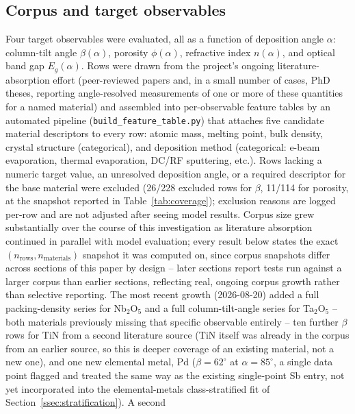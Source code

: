 \documentclass[aip,amsmath,amssymb,reprint]{revtex4-1}
\begin{document}
\subsection{Corpus and target observables}
\label{ssec:corpus}

Four target observables were evaluated, all as a function of
deposition angle $\alpha$: column-tilt angle $\beta(\alpha)$,
porosity $\phi(\alpha)$, refractive index $n(\alpha)$, and optical
band gap $E_g(\alpha)$. Rows were drawn from the project's ongoing
literature-absorption effort (peer-reviewed papers and, in a small
number of cases, PhD theses, reporting angle-resolved measurements of
one or more of these quantities for a named material) and assembled
into per-observable feature tables by an automated pipeline
(\texttt{build\_feature\_table.py}) that attaches five candidate
material descriptors to every row: atomic mass, melting point, bulk
density, crystal structure (categorical), and deposition method
(categorical: e-beam evaporation, thermal evaporation, DC/RF
sputtering, etc.). Rows lacking a numeric target value, an unresolved
deposition angle, or a required descriptor for the base material were
excluded (26/228 excluded rows for $\beta$, 11/114 for porosity, at the
snapshot reported in Table~\ref{tab:coverage}); exclusion reasons are
logged per-row and are not adjusted after seeing model results. Corpus
size grew substantially over the course of this investigation as
literature absorption continued in parallel with model evaluation;
every result below states the exact $(n_{\mathrm{rows}},
n_{\mathrm{materials}})$ snapshot it was computed on, since corpus
snapshots differ across sections of this paper by design -- later
sections report tests run against a larger corpus than earlier
sections, reflecting real, ongoing corpus growth rather than
selective reporting. The most recent growth (2026-08-20) added a
full packing-density series for Nb$_2$O$_5$ \citep{xiao2008} and a
full column-tilt-angle series for Ta$_2$O$_5$ \citep{sobahan2009} --
both materials previously missing that specific observable entirely
-- ten further $\beta$ rows for TiN from a second literature source
\citep{bouaouina2018} (TiN itself was already in the corpus from an
earlier source, so this is deeper coverage of an existing material,
not a new one), and one new elemental metal, Pd \citep{kim2005pd}
($\beta=62^{\circ}$ at $\alpha=85^{\circ}$, a single data point
flagged and treated the same way as the existing single-point Sb
entry, not yet incorporated into the elemental-metals
class-stratified fit of Section~\ref{ssec:stratification}). A second
\end{document}
